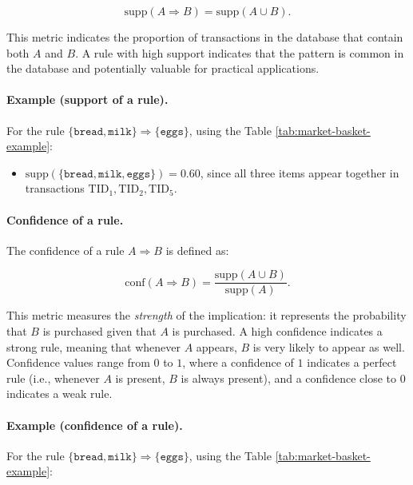 \begin{equation}
  \mathrm{supp}(A \Rightarrow B) = \mathrm{supp}(A \cup B).
\end{equation}

This metric indicates the proportion of transactions in the database that contain both $A$ and $B$. A rule with high support indicates that the pattern is common in the database and potentially valuable for practical applications.

\paragraph{Example (support of a rule).} For the rule $\{\texttt{bread}, \texttt{milk}\} \Rightarrow \{\texttt{eggs}\}$, using the Table \ref{tab:market-basket-example}:

\begin{itemize}
  \item $\mathrm{supp}(\{\texttt{bread}, \texttt{milk}, \texttt{eggs}\}) = 0.60$, since all three items appear together in transactions $\text{TID}_1, \text{TID}_2, \text{TID}_5$.
\end{itemize}


\paragraph{Confidence of a rule.} The confidence of a rule $A \Rightarrow B$ is defined as:

\begin{equation}
  \mathrm{conf}(A \Rightarrow B) = \frac{\mathrm{supp}(A \cup B)}{\mathrm{supp}(A)}.
\end{equation}

This metric measures the \emph{strength} of the implication: it represents the probability that $B$ is purchased given that $A$ is purchased. A high confidence indicates a strong rule, meaning that whenever $A$ appears, $B$ is very likely to appear as well. Confidence values range from $0$ to $1$, where a confidence of $1$ indicates a perfect rule (i.e., whenever $A$ is present, $B$ is always present), and a confidence close to $0$ indicates a weak rule.

\paragraph{Example (confidence of a rule).} For the rule $\{\texttt{bread}, \texttt{milk}\} \Rightarrow \{\texttt{eggs}\}$, using the Table \ref{tab:market-basket-example}:

